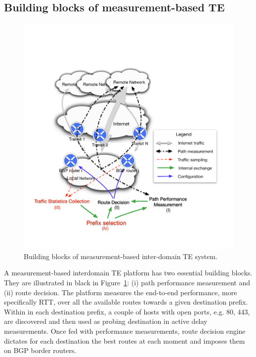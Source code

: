 \subsection{Building blocks of measurement-based TE}

\begin{figure}[!htb]
\centering
\includegraphics[width=\textwidth]{gfx/chap1/archi.pdf}
\caption{Building blocks of measurement-based inter-domain TE system.}
\label{fig:archi}
\end{figure}

A measurement-based interdomain TE platform has two essential building blocks.
They are illustrated in black in Figure~\ref{fig:archi}: (i) path performance measurement and (ii) route decision.
The platform measures the end-to-end performance, more specifically \acf{RTT}, over all the available routes towards a given destination prefix. 
Within in each destination prefix, a couple of hosts with open ports, e.g. 80, 443, are discovered and then used as probing destination in active delay measurements.
Once fed with performance measurements, route decision engine dictates for each destination the best routes at each moment and imposes them on BGP border routers.

